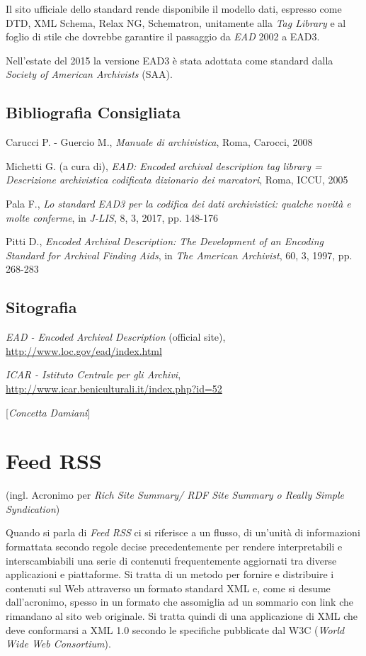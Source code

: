 {{Il sito ufficiale dello standard rende disponibile il modello dati,
espresso come DTD, XML Schema, Relax NG, Schematron, unitamente alla
\emph{Tag Library} e al foglio di stile che dovrebbe garantire il
passaggio da \emph{EAD} 2002 a EAD3.

Nell'estate del 2015 la versione EAD3 è stata adottata come standard
dalla \emph{Society of American Archivists} (SAA).

\section*{Bibliografia Consigliata}
{\parindent0pt 
Carucci P. - Guercio M., \emph{Manuale di archivistica}, Roma, Carocci,
2008

Michetti G. (a cura di), \emph{EAD: Encoded archival description tag
library = Descrizione archivistica codificata dizionario dei marcatori},
Roma, ICCU, 2005

Pala F., \emph{Lo standard EAD3 per la codifica dei dati archivistici:
qualche novità e molte conferme}, in \emph{J-LIS}, 8, 3, 2017, pp.
148-176

Pitti D., \emph{Encoded Archival Description: The Development of an
Encoding Standard for Archival Finding Aids}, in \emph{The American
Archivist}, 60, 3, 1997, pp. 268-283
}

\section*{Sitografia}
{\parindent0pt 
\emph{EAD - Encoded Archival Description} (official site),
\url{http://www.loc.gov/ead/index.html}

\emph{ICAR - Istituto Centrale per gli Archivi},
\url{http://www.icar.beniculturali.it/index.php?id=52}
}

\hrulefill 

{[}\emph{Concetta Damiani}{]}



\chapter{Feed RSS}

(ingl. Acronimo per \emph{Rich Site Summary/ RDF Site Summary o Really
Simple Syndication})

Quando si parla di \emph{Feed RSS} ci si riferisce a un flusso, di
un'unità di informazioni formattata secondo regole decise
precedentemente per rendere interpretabili e interscambiabili una serie
di contenuti frequentemente aggiornati tra diverse applicazioni e
piattaforme. Si tratta di un metodo per fornire e distribuire i
contenuti sul Web attraverso un formato standard XML e, come si desume
dall'acronimo, spesso in un formato che assomiglia ad un sommario con
link che rimandano al sito web originale. Si tratta quindi di una
applicazione di XML che deve conformarsi a XML 1.0 secondo le specifiche
pubblicate dal W3C (\emph{World Wide Web Consortium}).

}}
